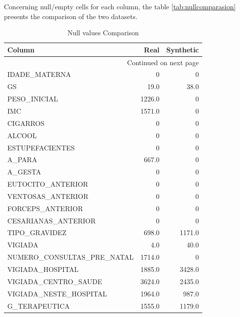 \documentclass{article}
\begin{document}
Concerning null/empty cells for each column, the table \ref{tab:nullcomparasion} presents the comparison of the two datasets.\\

\begin{longtable}{lrr}
\caption{Null values Comparison}\label{tab:nullcomparison}\\
\toprule
                        Column &    Real & Synthetic \\
\midrule
\endhead
\midrule
\multicolumn{3}{r}{{Continued on next page}} \\
\midrule
\endfoot

\bottomrule
\endlastfoot
                 IDADE\_MATERNA &       0 &         0 \\
                            GS &    19.0 &      38.0 \\
                  PESO\_INICIAL &  1226.0 &         0 \\
                           IMC &  1571.0 &         0 \\
                      CIGARROS &       0 &         0 \\
                        ALCOOL &       0 &         0 \\
               ESTUPEFACIENTES &       0 &         0 \\
                        A\_PARA &   667.0 &         0 \\
                       A\_GESTA &       0 &         0 \\
             EUTOCITO\_ANTERIOR &       0 &         0 \\
             VENTOSAS\_ANTERIOR &       0 &         0 \\
              FORCEPS\_ANTERIOR &       0 &         0 \\
           CESARIANAS\_ANTERIOR &       0 &         0 \\
                 TIPO\_GRAVIDEZ &   698.0 &    1171.0 \\
                       VIGIADA &     4.0 &      40.0 \\
    NUMERO\_CONSULTAS\_PRE\_NATAL &  1714.0 &         0 \\
              VIGIADA\_HOSPITAL &  1885.0 &    3428.0 \\
          VIGIADA\_CENTRO\_SAUDE &  3624.0 &    2435.0 \\
        VIGIADA\_NESTE\_HOSPITAL &  1964.0 &     987.0 \\
                 G\_TERAPEUTICA &  1555.0 &    1179.0 \\

\end{longtable}
\end{document}

